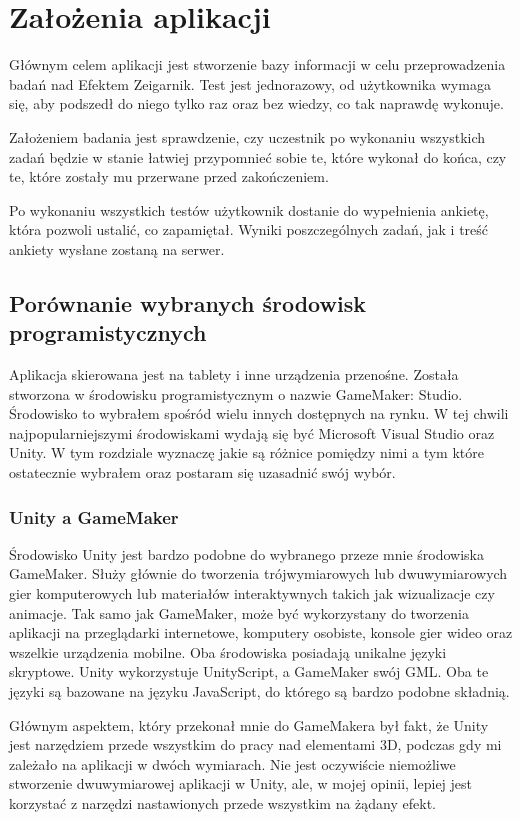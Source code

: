 \documentclass[openright]{xmgr}
\begin{document}
\chapter{Założenia aplikacji}
Głównym celem aplikacji jest stworzenie bazy informacji w celu przeprowadzenia
badań nad Efektem Zeigarnik. Test jest jednorazowy, od użytkownika
wymaga się, aby podszedł do niego tylko raz oraz bez wiedzy, co tak naprawdę
wykonuje.

Założeniem badania jest sprawdzenie, czy uczestnik po wykonaniu wszystkich
zadań będzie w stanie łatwiej przypomnieć sobie te, które wykonał do
końca, czy te, które zostały mu przerwane przed zakończeniem.

Po wykonaniu wszystkich testów użytkownik dostanie do wypełnienia
ankietę, która pozwoli ustalić, co zapamiętał. Wyniki poszczególnych
zadań, jak i treść ankiety wysłane zostaną na serwer.


\section{Porównanie wybranych środowisk programistycznych}
Aplikacja skierowana jest na tablety i inne urządzenia przenośne. Została
stworzona w środowisku programistycznym o nazwie GameMaker: Studio.
Środowisko to wybrałem spośród wielu innych dostępnych na rynku. W tej
chwili najpopularniejszymi środowiskami wydają się być Microsoft Visual
Studio oraz Unity. W tym rozdziale wyznaczę jakie są różnice pomiędzy
nimi a tym które ostatecznie wybrałem oraz postaram się uzasadnić swój wybór.


\subsection{Unity a GameMaker}
Środowisko Unity jest bardzo podobne do wybranego przeze mnie środowiska
GameMaker. Służy głównie do tworzenia trójwymiarowych lub dwuwymiarowych gier komputerowych lub materiałów interaktywnych
takich jak wizualizacje czy animacje. Tak samo jak GameMaker, może być wykorzystany do
tworzenia aplikacji na przeglądarki internetowe, komputery osobiste, konsole
gier wideo oraz wszelkie urządzenia mobilne. Oba środowiska posiadają unikalne
języki skryptowe. Unity wykorzystuje UnityScript, a GameMaker swój
GML. Oba te języki są bazowane na języku JavaScript, do którego są bardzo podobne składnią.

Głównym aspektem, który przekonał mnie do GameMakera był fakt, że Unity jest narzędziem przede wszystkim do pracy
nad elementami 3D, podczas gdy mi zależało na aplikacji w dwóch wymiarach. Nie
jest oczywiście niemożliwe stworzenie dwuwymiarowej aplikacji w Unity, ale, w mojej opinii, lepiej jest korzystać z narzędzi nastawionych przede wszystkim na żądany efekt.
\end{document}
